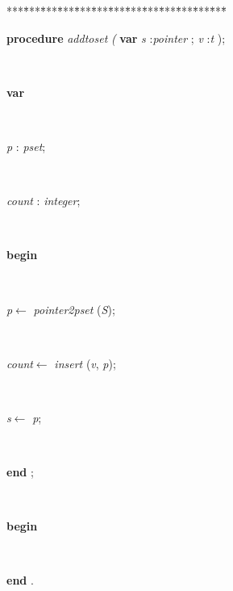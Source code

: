 \documentclass[10pt, a4paper]{article}
\begin{document}
\begin{tabbing}
***\=***\=***\=***\=***\=***\=***\=***\=***\=***\=***\=***\=***\=\kill
\parbox{14cm}{\textsf {\textbf {procedure } \textsf{ \textit{addtoset} \textit{(} } \textbf{ var } \textsf{ \textit{s} :\textit{pointer} ; \textit{v} :\textit{t} );}}}\\
\+\parbox{14cm}{\textsf{\textbf{var} }}\\
\parbox{14cm}{\textsf{\textit{p} : \textit{pset}}; }\\
\parbox{14cm}{\textsf{\textit{count} : \textit{integer}}; }\\
\-\<\+\parbox{14cm}{\textsf{\textbf{begin} }}\\
\parbox{14cm}{\textsf{\textit{p}$\leftarrow$ \textit{pointer2pset} (\textit{S})}; }\\
\parbox{14cm}{\textsf{\textit{count}$\leftarrow$ \textit{insert} (\textit{v}, \textit{p})}; }\\
\parbox{14cm}{\textsf{\textit{s}$\leftarrow$ \textit{p}}; }\\
\<\-\parbox{14cm}{\textsf{\textbf{end} ;}}\\
\+\parbox{14cm}{\textsf{\textbf{begin} }}\\
\<\-\parbox{14cm}{\textsf{\textbf{end} .}}\\
\end{tabbing}
\end{document}
